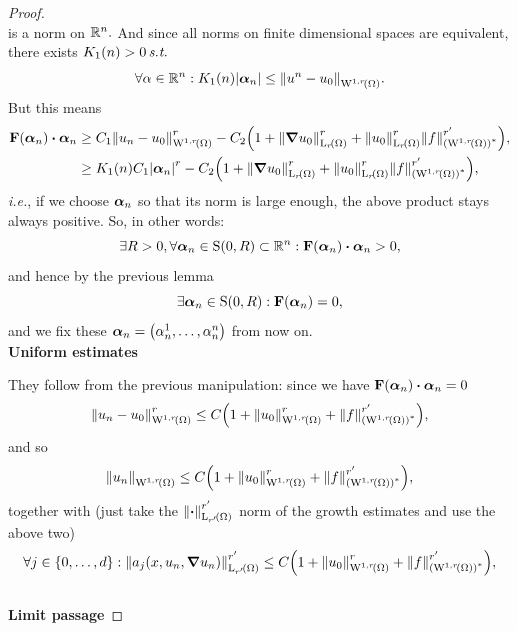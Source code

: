 \documentclass{article}
\begin{document}
\begin{proof}
\[	\]
	is a norm on ${\mathbb R}^{n}.$ And since all norms on finite dimensional spaces are equivalent, there exists $K_1(n) > 0 \, \text{\textit{s.t.}} \,$
	\[
		\forall \alpha \in \R^n: K_1(n) |\vb*{\alpha}_n| \leq \norm{u^n-u_0}_{\WkpSet[1][r]{\Omega}}.
	\]
	But this means
\begin{align*}
	\vb{F}\qty(\vb*{\alpha}_n) \vdot \vb*{\alpha}_n  &\geq C_1 \norm{u_n - u_0}_{\WkpSet[1][r]{\Omega}}^r - C_2\qty(1 + \norm{\grad u_0}_{\LpSet[r]{\Omega}}^r + \norm{u_0}_{\LpSet[r]{\Omega}}^r \norm{f}_{\qty(\WkpSet[1][r]{\Omega})^{*}}^{r'}),\\
							 &\geq K_1(n) C_1 \abs{\vb*{\alpha}_n}^r- C_2\qty(1 + \norm{\grad u_0}_{\LpSet[r]{\Omega}}^r + \norm{u_0}_{\LpSet[r]{\Omega}}^r \norm{f}_{\qty(\WkpSet[1][r]{\Omega})^{*}}^{r'}),
\end{align*}
\textit{i.e.}, if we choose $\vb*{\alpha}_n$ so that its norm is large enough, the above product stays always positive. So, in other words:
	\[
		\exists R>0, \forall \vb*{\alpha}_n \in \text{S}(0,R) \subset \R^n: \vb{F}\qty(\vb*{\alpha}_n) \vdot \vb*{\alpha}_n >0,
	\]
	and hence by the previous lemma
	\[
		\exists \vb*{\alpha}_n \in \text{S}(0,R): \vb{F}\qty(\vb*{\alpha}_n) = 0,
	\]
	and we fix these $\vb*{\alpha}_n = \qty(\alpha^1_n, \dots, \alpha_n^n)$ from now on. \\

	\textbf{Uniform estimates}


	They follow from the previous manipulation: since we have $\vb{F}\qty(\vb*{\alpha}_n) \vdot \vb*{\alpha}_n = 0$
	\[
		\norm{u_n-u_0}_{\WkpSet[1][r]{\Omega}}^r\leq C\qty(1+\norm{u_0}_{\WkpSet[1][r]{\Omega}}^r+ \norm{f}^{r'}_{\qty(\WkpSet[1][r]{\Omega})^{*}}),
	\]
	and so
	\[
		\norm{u_n}_{\WkpSet[1][r]{\Omega}} \leq C\qty(1+\norm{u_0}_{\WkpSet[1][r]{\Omega}}^r+ \norm{f}^{r'}_{\qty(\WkpSet[1][r]{\Omega})^{*}}),
	\]
	together with (just take the $\norm{\vdot}_{\LpSet[r']{\Omega}}^{r'}$ norm of the growth estimates and use the above two)
	\[
		\forall j \in \{0,\dots,d\}: \norm{a_j\qty(x, u_n, \grad u_n)}_{\LpSet[r']{\Omega}}^{r'} \leq C\qty(1+\norm{u_0}_{\WkpSet[1][r]{\Omega}}^r+ \norm{f}^{r'}_{\qty(\WkpSet[1][r]{\Omega})^{*}}),
	\] 
	\\

	\textbf{Limit passage}



\end{proof}
\end{document}
